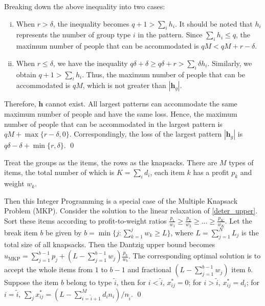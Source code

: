 \begin{pf}
Breaking down the above inequality into two cases:

\begin{enumerate}[(i)]
  \item When $r > \delta$, the inequality becomes $q+1 > \sum_{i} h_i$. It should be noted that $h_i$ represents the number of group type $i$ in the pattern. Since $\sum_{i} h_i \leq q$, the maximum number of people that can be accommodated is $q M < q M + r-\delta$.  
  \item When $r \leq \delta$, we have the inequality $q \delta + \delta \geq q \delta + r > \sum_{i} \delta h_i$. Similarly, we obtain $q+1 > \sum_{i} h_i$. Thus, the maximum number of people that can be accommodated is $q M$, which is not greater than $|\bm{h}_{g}|$.  
\end{enumerate}

Therefore, $\bm{h}$ cannot exist. All largest patterns can accommodate the same maximum number of people and have the same loss. Hence, the maximum number of people that can be accommodated in the largest pattern is $q M + \max\{r-\delta, 0\}$. Correspondingly, the loss of the largest pattern $|\bm{h}_{g}|$ is $q \delta -\delta + \min\{r, \delta\}$.
\qed
\end{pf}

\begin{pf}
  Treat the groups as the items, the rows as the knapsacks. There are $M$ types of items, the total number of which is $K = \sum_{i} d_i$, each item $k$ has a profit $p_k$ and weight $w_k$. 
  
  Then this Integer Programming is a special case of the Multiple Knapsack Problem (MKP). Consider the solution to the linear relaxation of \eqref{deter_upper}. Sort these items according to profit-to-weight ratios $\frac{p_1}{w_1} \geq \frac{p_2}{w_2} \geq \ldots \geq \frac{p_K}{w_K}$. 
  Let the break item $b$ be given by $b=\min \{j: \sum_{k=1}^j w_k \geq L\}$, where $L = \sum_{j=1}^{N} L_j$ is the total size of all knapsacks. Then the Dantzig upper bound \cite{dantzig1957discrete} becomes $u_{\mathrm{MKP}}=\sum_{j=1}^{b-1} p_j+\left(L-\sum_{j=1}^{b-1} w_j\right) \frac{p_b}{w_b}$. The corresponding optimal solution is to accept the whole items from $1$ to $b-1$ and fractional $(L-\sum_{j=1}^{b-1} w_j)$ item $b$. Suppose the item $b$ belong to type $\tilde{i}$, then for $i < \tilde{i}$, $x_{ij}^{*} = 0$; for $i > \tilde{i}$, $x_{ij}^{*} = d_{i}$; for $i = \tilde{i}$, $\sum_{j} x_{ij}^{*} = (L - \sum_{i = \tilde{i}+1}^{M} {d_i n_i})/ n_{\tilde{i}}$. \qed
\end{pf}


